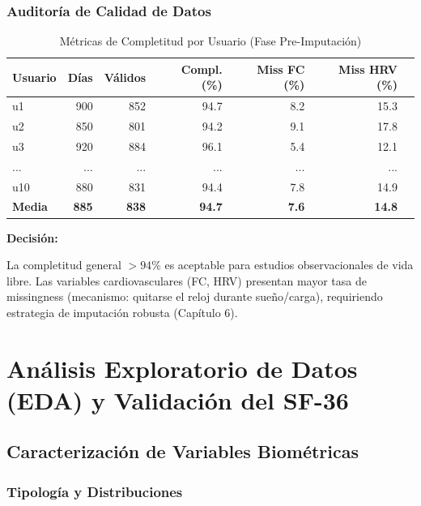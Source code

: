 \documentclass[12pt,letterpaper,twoside]{report}
\begin{document}
\subsection{Auditoría de Calidad de Datos}

\begin{table}[htbp]
\centering
\caption{Métricas de Completitud por Usuario (Fase Pre-Imputación)}
\label{tab:data_quality_raw}
\small
\begin{tabular}{lrrrrrr}
\toprule
\textbf{Usuario} & \textbf{Días} & \textbf{Válidos} & \textbf{Compl. (\%)} & \textbf{Miss FC (\%)} & \textbf{Miss HRV (\%)} \\
\midrule
u1  & 900 & 852 & 94.7 & 8.2 & 15.3 \\
u2  & 850 & 801 & 94.2 & 9.1 & 17.8 \\
u3  & 920 & 884 & 96.1 & 5.4 & 12.1 \\
... & ... & ... & ... & ... & ... \\
u10 & 880 & 831 & 94.4 & 7.8 & 14.9 \\
\midrule
\textbf{Media} & \textbf{885} & \textbf{838} & \textbf{94.7} & \textbf{7.6} & \textbf{14.8} \\
\bottomrule
\end{tabular}
\end{table}

\begin{decisionbox}
\textbf{Decisión:}

La completitud general $>94\%$ es aceptable para estudios observacionales de vida libre. Las variables cardiovasculares (FC, HRV) presentan mayor tasa de missingness (mecanismo: quitarse el reloj durante sueño/carga), requiriendo estrategia de imputación robusta (Capítulo 6).
\end{decisionbox}

\chapter{Análisis Exploratorio de Datos (EDA) y Validación del SF-36}

\section{Caracterización de Variables Biométricas}

\subsection{Tipología y Distribuciones}
\end{document}

